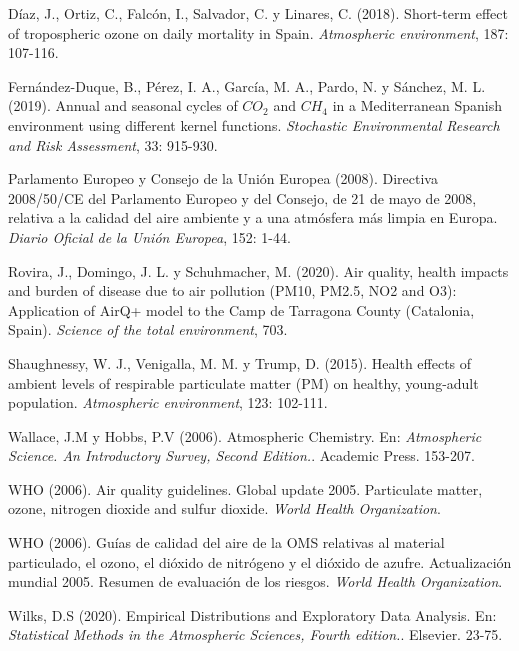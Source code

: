 \documentclass[12pt]{article}
\begin{document}
\begin{thebibliography}{99}

 Díaz, J., Ortiz, C., Falcón, I., Salvador, C. y Linares, C. (2018). Short-term effect of tropospheric ozone on daily mortality in Spain. \textit{Atmospheric environment}, 187: 107-116.

 Fernández-Duque, B., Pérez, I. A., García, M. A., Pardo, N. y Sánchez, M. L. (2019). Annual and seasonal cycles of $CO_{2}$ and $CH_{4}$ in a Mediterranean Spanish environment using different kernel functions. \textit{Stochastic Environmental Research and Risk Assessment}, 33: 915-930.

 Parlamento Europeo y Consejo de la Unión Europea (2008). Directiva 2008/50/CE del Parlamento Europeo y del Consejo, de 21 de mayo de 2008, relativa a la calidad del aire ambiente y a una atmósfera más limpia en Europa. \textit{Diario Oficial de la Unión Europea}, 152: 1-44.

 Rovira, J., Domingo, J. L. y Schuhmacher, M. (2020). Air quality, health impacts and burden of disease due to air pollution (PM10, PM2.5, NO2 and O3): Application of AirQ+ model to the Camp de Tarragona County (Catalonia, Spain). \textit{Science of the total environment}, 703.

 Shaughnessy, W. J., Venigalla, M. M. y Trump, D. (2015). Health effects of ambient levels of respirable particulate matter (PM) on healthy, young-adult population. \textit{Atmospheric environment}, 123: 102-111.

 Wallace, J.M y Hobbs, P.V (2006). Atmospheric Chemistry. En: \textit{Atmospheric Science. An Introductory Survey, Second Edition.}. Academic Press. 153-207.

 WHO (2006). Air quality guidelines. Global update 2005. Particulate matter, ozone, nitrogen dioxide and sulfur dioxide. \textit{World Health Organization}.

 WHO (2006). Guías de calidad del aire de la OMS relativas al material particulado, el ozono, el dióxido de nitrógeno y el dióxido de azufre. Actualización mundial 2005. Resumen de evaluación de los riesgos. \textit{World Health Organization}.

 Wilks, D.S (2020). Empirical Distributions and Exploratory Data Analysis. En: \textit{Statistical Methods in the Atmospheric Sciences, Fourth edition.}. Elsevier. 23-75.

\end{thebibliography}
\end{document}
